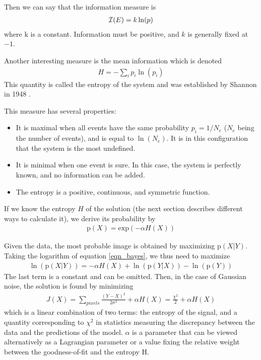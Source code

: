 Then we can say that the information measure is
\begin{eqnarray}
{\cal I}(E) = k \ln(p)
\end{eqnarray}
where k is a constant. Information must be positive, and $k$
is generally fixed at $-1$.

Another interesting measure is the mean information which is denoted
\begin{eqnarray}
H = - \sum_i p_i \ln(p_i)
\end{eqnarray}
This quantity is called the entropy of the system and was established by 
Shannon in 1948 \cite{ima:shannon48}.

This measure has several properties:
\begin{itemize}
\item It is maximal when all events have the same probability 
$p_i = 1/ N_e$ ($N_e$ being the number of events), and is equal to 
$\ln(N_e)$. It is in this 
configuration that the system is the most undefined.
\item It is minimal when one event is sure. In this case, the system is 
perfectly known, and no information can be added.
\item The entropy is a positive, continuous, and symmetric function.
\end{itemize}

If we know the entropy $H$ of the solution (the next section 
describes different ways to calculate it), 
we derive its probability by
\begin{eqnarray}
\mathrm{p}(X) = \mathrm{exp}(- \alpha H(X))
\label{info_prop}
\end{eqnarray}

Given the data, the most probable image is obtained by maximizing
$\mathrm{p}(X|Y)$. Taking the logarithm of equation \ref{eqn_bayes}, we 
thus need to maximize
\begin{eqnarray}
 \ln (\mathrm{p}(X|Y))  = - \alpha  H(X) + \ln(\mathrm{p}(Y|X)) - 
\ln(\mathrm{p}(Y))
\end{eqnarray}
The last term is a constant and can be omitted.
Then, in the case of Gaussian noise, the solution is found by minimizing 
\begin{eqnarray}
J(X) = \sum_{pixels} \frac{{(Y-X)}^{2}}{2 {\sigma}^{2}} + {\alpha} H(X)
= \frac{{\chi}^2}{2} + {\alpha} H(X)
\label{eqn_j1}
\end{eqnarray}
which is a linear combination of two terms: the entropy of the signal,
and a quantity corresponding to ${\chi}^2$ in statistics measuring the
discrepancy between the data and the predictions of the model.
$\alpha$ is a parameter that can be viewed alternatively as 
a Lagrangian parameter or a value fixing the relative weight between 
the goodness-of-fit and the entropy H. 

